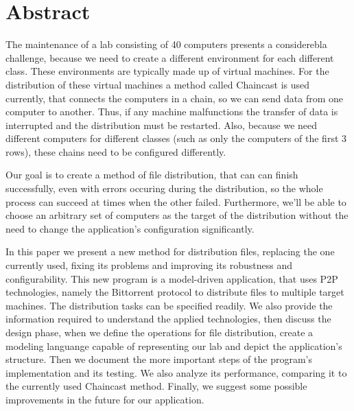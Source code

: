 \chapter*{Abstract}

The maintenance of a lab consisting of 40 computers presents a considerebla challenge, because we need to create a different environment for each different class. These environments are typically made up of virtual machines. For the distribution of these virtual machines a method called Chaincast is used currently, that connects the computers in a chain, so we can send data from one computer to another. Thus, if any machine malfunctions the transfer of data is interrupted and the distribution must be restarted. Also, because we need different computers for different classes (such as only the computers of the first 3 rows), these chains need to be configured differently.

Our goal is to create a method of file distribution, that can can finish successfully, even with errors occuring during the distribution, so the whole process can succeed at times when the other failed. Furthermore, we'll be able to choose an arbitrary set of computers as the target of the distribution without the need to change the application's configuration significantly.

In this paper we present a new method for distribution files, replacing the one currently used, fixing its problems and improving its robustness and configurability. 
This new program is a model-driven application, that uses P2P technologies, namely the Bittorrent protocol to distribute files to multiple target machines. The distribution tasks can be specified readily. We also provide the information required to understand the applied technologies, then discuss the design phase, when we define the operations for file distribution, create a modeling languange capable of representing our lab and depict the application's structure. Then we document the more important steps of the program's implementation and its testing. We also analyze its performance, comparing it to the currently used Chaincast method. Finally, we suggest some possible improvements in the future for our application.
\vfill

\selectthesislanguage
{}
\setcounter{romanPage}{\value{page}}
